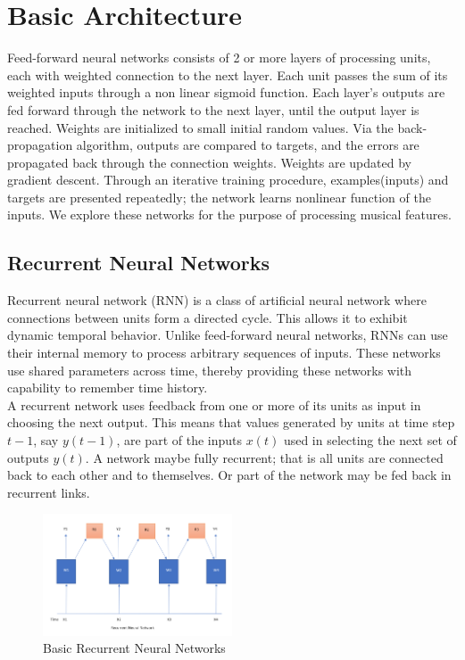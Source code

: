 \documentclass[conference]{IEEEtran}
\begin{document}
\section{Basic Architecture}
Feed-forward neural networks consists of 2 or more layers of processing units, each with weighted connection to the next layer. Each unit passes the sum of its weighted inputs through a non linear sigmoid function. Each layer's outputs are fed forward through the network to the next layer, until the output layer is reached. Weights are initialized to small initial random values. Via the back-propagation algorithm, outputs are compared to targets, and the errors are propagated back through the connection weights. Weights are updated by gradient descent. Through an iterative training procedure, examples(inputs) and targets are presented repeatedly; the network learns nonlinear function of the inputs. We explore these networks for the purpose of processing musical features.\cite{judy1}

\subsection{Recurrent Neural Networks}
Recurrent neural network (RNN) is a class of artificial neural network where connections between units form a directed cycle. This allows it to exhibit dynamic temporal behavior. Unlike feed-forward neural networks, RNNs can use their internal memory to process arbitrary sequences of inputs. These networks use shared parameters across time, thereby providing these networks with capability to remember time history.\\

A recurrent network uses feedback from one or more of its units as input in choosing the next output. This means that values generated by units at time step $t-1$, say $y(t-1)$, are part of the inputs $x(t)$ used in selecting the next set of outputs $y(t)$. A network maybe fully recurrent; that is all units are connected back to each other and to themselves. Or part of the network may be fed back in recurrent links. \cite{judy1}\\

\begin{figure}[h]
\includegraphics[width=0.5\textwidth]{1.PNG}
\caption{Basic Recurrent Neural Networks}
\label{fig:figure7}
\end{figure}
\end{document}

